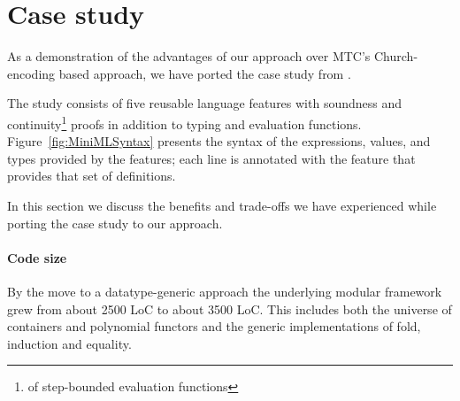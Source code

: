 \makeatother
\EndFmtInput
%

























%
%
%
\makeatletter

\newcommand\hsexists{\global\let\hsdot=\hsperiodonce}

\AtHaskellReset{\global\let\hsdot=\hscompose}

\HaskellReset

\makeatother
\EndFmtInput

\section{Case study}
\label{sec:casestudy}

As a demonstration of the advantages of our approach over MTC's
Church-encoding based approach, we have ported the case study from
\cite{mtc}.

The study consists of five reusable language features with soundness
and continuity\footnote{of step-bounded evaluation functions} proofs
in addition to typing and evaluation functions.
Figure~\ref{fig:MiniMLSyntax} presents the syntax of the expressions,
values, and types provided by the features; each line is annotated
with the feature that provides that set of definitions.



In this section we discuss the benefits and trade-offs we have
experienced while porting the case study to our approach.

\paragraph{Code size}

By the move to a datatype-generic approach the underlying modular
framework grew from about 2500 LoC to about 3500 LoC. This includes
both the universe of containers and polynomial functors and the
generic implementations of fold, induction and equality.

